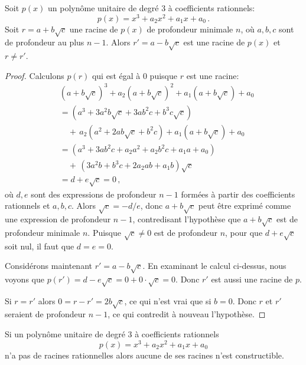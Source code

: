 \begin{theorem}\label{thm.trisect.conjugate}
Soit $p(x)$ un polynôme unitaire de degré 3 à coefficients rationnels:
\[
p(x)=x^3+a_2x^2+a_1x+a_0\,.
\]
Soit $r=a+b\sqrt{c}$ une racine de $p(x)$ de profondeur minimale $n$, où $a,b,c$ sont de profondeur au plus $n-1$. Alors $r'=a-b\sqrt{c}$ est une racine de $p(x)$ et $r\neq r'$.
\end{theorem}



\begin{proof} Calculons $p(r)$ qui est égal à $0$ puisque $r$ est une racine:
\begin{align*}
&(a+b\sqrt{c})^3+a_2(a+b\sqrt{c})^2+a_1(a+b\sqrt{c})+a_0\\
&=(a^3+3a^2b\sqrt{c}+3ab^2c+b^3c\sqrt{c})\\
&\quad+\,a_2(a^2+2ab\sqrt{c}+b^2c) +a_1(a+b\sqrt{c}) +a_0\\
&=(a^3+3ab^2c+a_2a^2+a_2b^2c+a_1a+a_0)\\
&\quad+\,(3a^2b+b^3c+2a_2ab+a_1b)\sqrt{c}\\
&=d+e\sqrt{c}=0\,,
\end{align*}
où $d,e$ sont des expressions de profondeur $n-1$ formées à partir des coefficients rationnels et $a,b,c$. Alors $\sqrt{c}=-d/e$, donc $a+b\sqrt{c}$ peut être exprimé comme une expression de profondeur $n-1$, contredisant l'hypothèse que $a+b\sqrt{c}$ est de profondeur minimale $n$. Puisque $\sqrt{c}\neq 0$  est de profondeur $n$, pour que $d+e\sqrt{c}$ soit nul, il faut que $d=e=0$.

Considérons maintenant $r'=a-b\sqrt{c}$. En examinant le calcul ci-dessus, nous voyons que $p(r')=d-e\sqrt{c}=0+0\cdot\sqrt{c}=0$. Donc $r'$ est aussi une racine de $p$.

Si $r= r'$ alors $0=r-r'=2b\sqrt{c}$, ce qui n'est vrai que si $b=0$. Donc $r$ et $r'$ seraient de profondeur $n-1$, ce qui contredit à nouveau l'hypothèse.
\end{proof}                                

\begin{theorem}
Si un polynôme unitaire de degré 3 à coefficients rationnels 
\[p(x)=x^3+a_2x^2+a_1x+a_0\] n'a pas de racines rationnelles alors aucune de ses racines n'est constructible.
\end{theorem}

